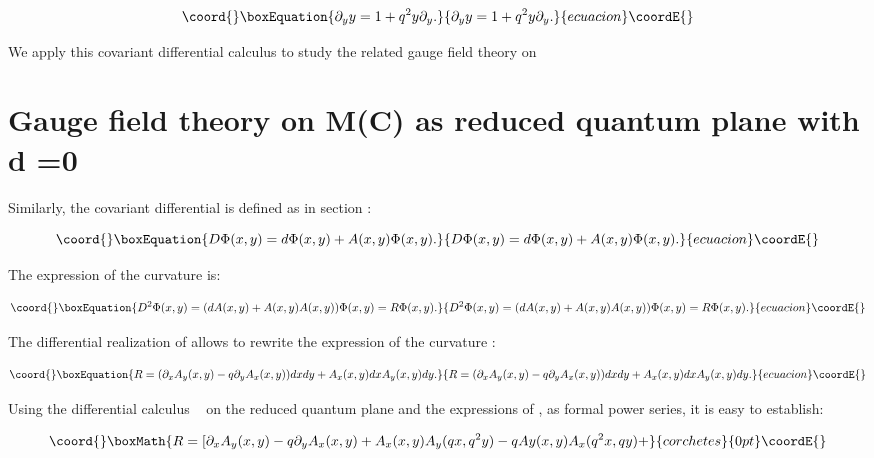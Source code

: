\documentclass[a4paper,12pt,thmsa]{article}
\begin{document}
\begin{equation}\coord{}\boxEquation{
\partial _{y}y=1+q^{2}y\partial _{y}.
}{
\partial _{y}y=1+q^{2}y\partial _{y}.
}{ecuacion}\coordE{}\end{equation}

We apply this covariant differential calculus to study the related gauge
field theory on \coordHE{}

\section{ Gauge field theory on M\coordHE{}(C) as reduced quantum plane with d\coordHE{}%
=0}

Similarly, the covariant differential is defined as in section \coordHE{}:

\begin{equation}\coord{}\boxEquation{
D\Phi (x,y)=d\Phi (x,y)+A(x,y)\Phi (x,y).
}{
D\Phi (x,y)=d\Phi (x,y)+A(x,y)\Phi (x,y).
}{ecuacion}\coordE{}\end{equation}

The expression of the curvature is:

\begin{equation}\coord{}\boxEquation{
D^{2}\Phi (x,y)=(dA(x,y)+A(x,y)A(x,y))\Phi (x,y)=R\Phi (x,y).
}{
D^{2}\Phi (x,y)=(dA(x,y)+A(x,y)A(x,y))\Phi (x,y)=R\Phi (x,y).
}{ecuacion}\coordE{}\end{equation}

The differential realization of \coordHE{}  \coordHE{} allows to rewrite the
expression of the curvature \coordHE{}:

\begin{equation}\coord{}\boxEquation{
R=(\partial _xA_y(x,y)-q\partial _yA_x(x,y))dxdy+A_x(x,y)dxA_y(x,y)dy.
}{
R=(\partial _xA_y(x,y)-q\partial _yA_x(x,y))dxdy+A_x(x,y)dxA_y(x,y)dy.
}{ecuacion}\coordE{}\end{equation}

Using the differential calculus ~\coordHE{} on the reduced quantum plane
and the expressions of \coordHE{}, \coordHE{}  \coordHE{} as formal power
series, it is easy to establish:

\[\coord{}\boxMath{
R=[\partial _xA_y(x,y)-q\partial
_yA_x(x,y)+A_x(x,y)A_y(qx,q^2y)-qAy(x,y)A_x(q^2x,qy)+
}{corchetes}{0pt}\coordE{}\]
\end{document}

